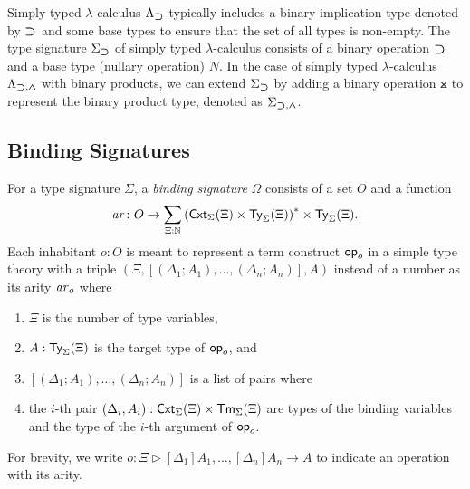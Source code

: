 \begin{example}\label{ex:implication}
  Simply typed $\lambda$-calculus $\Lambda_{\mathbin{\bm{\supset}}}$ typically includes a binary implication type denoted by $\mathbin{\bm{\supset}}$ and some base types to ensure that the set of all types is non-empty.
  The type signature $\Sigma_{\mathbin{\bm{\supset}}}$ of simply typed $\lambda$-calculus consists of a binary operation $\mathbin{\bm{\supset}}$ and a base type (nullary operation) $N$.
  In the case of simply typed $\lambda$-calculus $\Lambda_{\mathbin{\bm{\supset}}, \mathbin{\bm{\wedge}}}$ with binary products, we can extend $\Sigma_{\mathbin{\bm{\supset}}}$ by adding a binary operation $\btimes$ to represent the binary product type, denoted as $\Sigma_{\mathbin{\bm{\supset}}, \mathbin{\bm{\wedge}}}$.
\end{example}

\subsection{Binding Signatures} \label{subsec:binding-sig}
\begin{definition}\label{def:binding-signature}
  For a type signature $\Sigma$, a \emph{binding signature} $\Omega$ consists of a set $O$ and a function
  \[
    \mathit{ar}\colon O \to \sum_{\Xi : \mathbb{N}} \left(\mathsf{Cxt}_\Sigma(\Xi) \times \mathsf{Ty}_\Sigma(\Xi)\right)^* \times \mathsf{Ty}_\Sigma(\Xi).
  \]
  Each inhabitant $o: O$ is meant to represent a term construct $\mathsf{op}_o$ in a simple type theory with a triple $\left(\Xi, \left[\left(\Delta_1; A_1\right), \ldots, \left(\Delta_{n}; A_{n}\right) \right], A\right)$
  instead of a number as its arity $\mathit{ar}_o$ where
  \begin{enumerate}
    \item $\Xi$ is the number of type variables, 
    \item $A : \mathsf{Ty}_\Sigma(\Xi)$ is the target type of $\mathsf{op}_o$, and
    \item $\left[\left(\Delta_1; A_{1}\right), \ldots, \left(\Delta_{n}; A_{n}\right) \right]$ is a list of pairs where
    \item the $i$-th pair $(\Delta_i, A_i) :\mathsf{Cxt}_{\Sigma}(\Xi) \times \mathsf{Tm}_{\Sigma}(\Xi)$ are types of the binding variables and the type of the $i$-th argument of $\mathsf{op}_{o}$.
  \end{enumerate}
  For brevity, we write $o \colon \Xi \rhd [\Delta_1]A_{1}, \ldots, \left[\Delta_{n}\right] A_{n} \to A$ to indicate an operation with its arity. 
\end{definition}
\begin{remark}
  \cite{Aczel1978,Fiore2010}
\end{remark}


